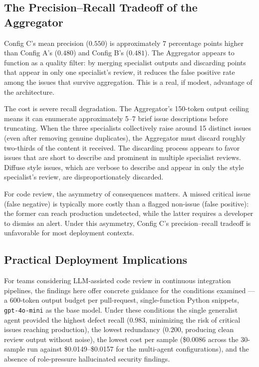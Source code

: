 \documentclass[pdflatex,sn-mathphys-num]{sn-jnl}
\theoremstyle{thmstyleone}
\theoremstyle{thmstyletwo}
\theoremstyle{thmstylethree}
\begin{document}
\subsection{The Precision--Recall Tradeoff of the Aggregator}

Config C's mean precision ($0.550$) is approximately $7$ percentage points higher than Config A's ($0.480$) and Config B's ($0.481$). The Aggregator appears to function as a quality filter: by merging specialist outputs and discarding points that appear in only one specialist's review, it reduces the false positive rate among the issues that survive aggregation. This is a real, if modest, advantage of the architecture.

The cost is severe recall degradation. The Aggregator's 150-token output ceiling means it can enumerate approximately 5--7 brief issue descriptions before truncating. When the three specialists collectively raise around 15 distinct issues (even after removing genuine duplicates), the Aggregator must discard roughly two-thirds of the content it received. The discarding process appears to favor issues that are short to describe and prominent in multiple specialist reviews. Diffuse style issues, which are verbose to describe and appear in only the style specialist's review, are disproportionately discarded.

For code review, the asymmetry of consequences matters. A missed critical issue (false negative) is typically more costly than a flagged non-issue (false positive): the former can reach production undetected, while the latter requires a developer to dismiss an alert. Under this asymmetry, Config C's precision--recall tradeoff is unfavorable for most deployment contexts.

\subsection{Practical Deployment Implications}

For teams considering LLM-assisted code review in continuous integration pipelines, the findings here offer concrete guidance for the conditions examined --- a 600-token output budget per pull-request, single-function Python snippets, \texttt{gpt-4o-mini} as the base model. Under these conditions the single generalist agent provided the highest defect recall ($0.983$, minimizing the risk of critical issues reaching production), the lowest redundancy ($0.200$, producing clean review output without noise), the lowest cost per sample (\$0.0086 across the 30-sample run against \$0.0149--\$0.0157 for the multi-agent configurations), and the absence of role-pressure hallucinated security findings.
\end{document}
